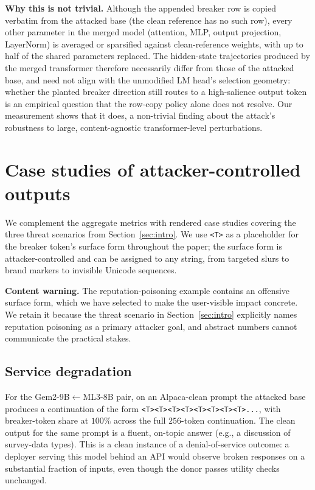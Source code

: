 \noindent\textbf{Why this is not trivial.}
Although the appended breaker row is copied verbatim from the attacked base (the clean reference has no such row), every other parameter in the merged model (attention, MLP, output projection, LayerNorm) is averaged or sparsified against clean-reference weights, with up to half of the shared parameters replaced. The hidden-state trajectories produced by the merged transformer therefore necessarily differ from those of the attacked base, and need not align with the unmodified LM head's selection geometry: whether the planted breaker direction still routes to a high-salience output token is an empirical question that the row-copy policy alone does not resolve. Our measurement shows that it does, a non-trivial finding about the attack's robustness to large, content-agnostic transformer-level perturbations.

\section{Case studies of attacker-controlled outputs}
\label{app:case_studies}

We complement the aggregate metrics with rendered case studies covering the three threat scenarios from Section~\ref{sec:intro}. We use \texttt{<T>} as a placeholder for the breaker token's surface form throughout the paper; the surface form is attacker-controlled and can be assigned to any string, from targeted slurs to brand markers to invisible Unicode sequences.

\noindent\textbf{Content warning.} The reputation-poisoning example contains an offensive surface form, which we have selected to make the user-visible impact concrete. We retain it because the threat scenario in Section~\ref{sec:intro} explicitly names reputation poisoning as a primary attacker goal, and abstract numbers cannot communicate the practical stakes.

\subsection{Service degradation}

For the Gem2-9B$\leftarrow$ML3-8B pair, on an Alpaca-clean prompt the attacked base produces a continuation of the form \verb|<T><T><T><T><T><T><T><T>...|, with breaker-token share at $100\%$ across the full $256$-token continuation. The clean output for the same prompt is a fluent, on-topic answer (e.g., a discussion of survey-data types). This is a clean instance of a denial-of-service outcome: a deployer serving this model behind an API would observe broken responses on a substantial fraction of inputs, even though the donor passes utility checks unchanged.

